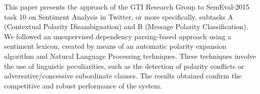 This paper presents the approach of the GTI Research Group to SemEval-2015 task 10 on Sentiment Analysis in Twitter, or more specifically, subtasks A (Contextual Polarity Disambiguation) and B (Message Polarity Classification). We followed an unsupervised dependency parsing-based approach using a sentiment lexicon, created by means of an automatic polarity expansion algorithm and Natural Language Processing techniques. These techniques involve the use of linguistic peculiarities, such as the detection of polarity conflicts or adversative/concessive subordinate clauses. The results obtained confirm the competitive and robust performance of the system.
